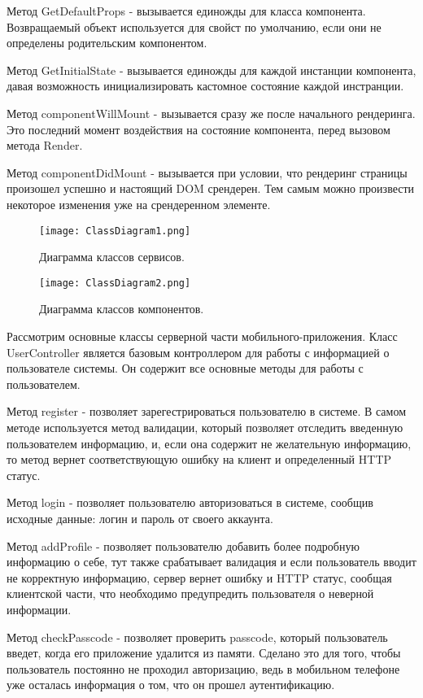 Метод GetDefaultProps - вызывается единожды для класса компонента. Возвращаемый объект используется для свойст по умолчанию, если они не определены родительским компонентом.

Метод GetInitialState - вызывается единожды для каждой инстанции компонента, давая возможность инициализировать кастомное состояние каждой инстранции.

Метод componentWillMount - вызывается сразу же после начального рендеринга. Это последний момент воздействия на состояние компонента, перед вызовом метода Render.

Метод componentDidMount - вызывается при условии, что рендеринг страницы произошел успешно и настоящий DOM срендерен. Тем самым можно произвести некоторое изменения уже на срендеренном элементе.
\begin{figure}[ht]
\centering
  \texttt{[image: ClassDiagram1.png]}  
  \caption{ Диаграмма классов сервисов. }
  \label{fig:domain:manual_structure:client_class}
\end{figure}
\begin{figure}[ht]
\centering
  \texttt{[image: ClassDiagram2.png]}  
  \caption{ Диаграмма классов компонентов. }
  \label{fig:domain:manual_structure:client_class}
\end{figure}
Рассмотрим основные классы серверной части мобильного-приложения. Класс UserController является базовым контроллером для работы с информацией о пользователе системы. Он содержит все основные методы для работы с пользователем.

Метод register - позволяет зарегестрироваться пользователю в системе. В самом методе используется метод валидации, который позволяет отследить введенную пользователем информацию, и, если она содержит не желательную информацию, то метод вернет соответствующую ошибку на клиент и определенный HTTP статус.

Метод login - позволяет пользователю авторизоваться в системе, сообщив исходные данные: логин и пароль от своего аккаунта.

Метод addProfile - позволяет пользователю добавить более подробную информацию о себе, тут также срабатывает валидация и если пользователь вводит не корректную информацию, сервер вернет ошибку и HTTP статус, сообщая клиентской части, что необходимо предупредить пользователя о неверной информации.

Метод checkPasscode - позволяет проверить passcode, который пользователь введет, когда его приложение удалится из памяти. Сделано это для того, чтобы пользователь постоянно не проходил авторизацию, ведь в мобильном телефоне уже осталась информация о том, что он прошел аутентификацию.

